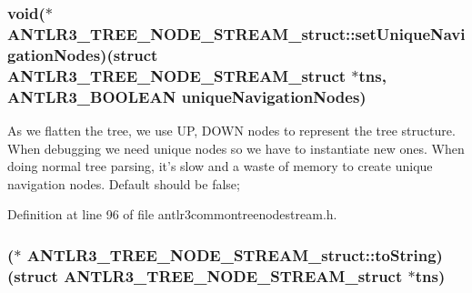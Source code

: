 \hypertarget{struct_a_n_t_l_r3___t_r_e_e___n_o_d_e___s_t_r_e_a_m__struct_a88d9c6dd1cd4de3b2338a44077f10aad}{
\subsubsection[{set\-Unique\-Navigation\-Nodes}]{\setlength{\rightskip}{0pt plus 5cm}void($\ast$ A\-N\-T\-L\-R3\-\_\-\-T\-R\-E\-E\-\_\-\-N\-O\-D\-E\-\_\-\-S\-T\-R\-E\-A\-M\-\_\-struct\-::set\-Unique\-Navigation\-Nodes)(struct {\bf A\-N\-T\-L\-R3\-\_\-\-T\-R\-E\-E\-\_\-\-N\-O\-D\-E\-\_\-\-S\-T\-R\-E\-A\-M\-\_\-struct} $\ast$tns, {\bf A\-N\-T\-L\-R3\-\_\-\-B\-O\-O\-L\-E\-A\-N} unique\-Navigation\-Nodes)}}\label{struct_a_n_t_l_r3___t_r_e_e___n_o_d_e___s_t_r_e_a_m__struct_a88d9c6dd1cd4de3b2338a44077f10aad}
As we flatten the tree, we use U\-P, D\-O\-W\-N nodes to represent the tree structure. When debugging we need unique nodes so we have to instantiate new ones. When doing normal tree parsing, it's slow and a waste of memory to create unique navigation nodes. Default should be false; 

Definition at line 96 of file antlr3commontreenodestream.\-h.

\hypertarget{struct_a_n_t_l_r3___t_r_e_e___n_o_d_e___s_t_r_e_a_m__struct_a23ecc8ce37b51030490558a7b3cc4e44}{
\subsubsection[{to\-String}]{($\ast$ A\-N\-T\-L\-R3\-\_\-\-T\-R\-E\-E\-\_\-\-N\-O\-D\-E\-\_\-\-S\-T\-R\-E\-A\-M\-\_\-struct\-::to\-String)(struct {\bf A\-N\-T\-L\-R3\-\_\-\-T\-R\-E\-E\-\_\-\-N\-O\-D\-E\-\_\-\-S\-T\-R\-E\-A\-M\-\_\-struct} $\ast$tns)}}\label{struct_a_n_t_l_r3___t_r_e_e___n_o_d_e___s_t_r_e_a_m__struct_a23ecc8ce37b51030490558a7b3cc4e44}


